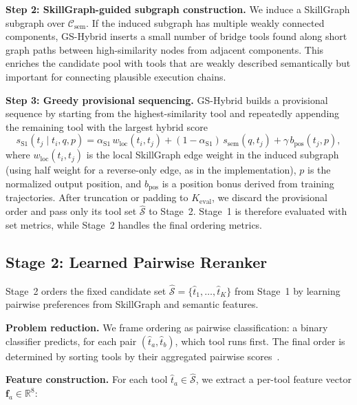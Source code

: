 \documentclass[lettersize,journal]{IEEEtran}
\begin{document}
\textbf{Step 2: SkillGraph-guided subgraph construction.}
We induce a SkillGraph subgraph over $\mathcal{C}_{\text{sem}}$.
If the induced subgraph has multiple weakly connected components, GS-Hybrid inserts a small number of bridge tools found along short graph paths between high-similarity nodes from adjacent components.
This enriches the candidate pool with tools that are weakly described semantically but important for connecting plausible execution chains.

\textbf{Step 3: Greedy provisional sequencing.}
GS-Hybrid builds a provisional sequence by starting from the highest-similarity tool and repeatedly appending the remaining tool with the largest hybrid score
\begin{equation}
    s_{\text{S1}}(t_j \mid t_i, q, p)
    = \alpha_{\text{S1}} \, w_{\text{loc}}(t_i, t_j)
    + (1 - \alpha_{\text{S1}})\, s_{\text{sem}}(q, t_j)
    + \gamma \, b_{\text{pos}}(t_j, p),
    \label{eq:stage1score}
\end{equation}
where $w_{\text{loc}}(t_i, t_j)$ is the local SkillGraph edge weight in the induced subgraph (using half weight for a reverse-only edge, as in the implementation), $p$ is the normalized output position, and $b_{\text{pos}}$ is a position bonus derived from training trajectories.
After truncation or padding to $K_{\mathrm{eval}}$, we discard the provisional order and pass only its tool set $\hat{\mathcal{S}}$ to Stage~2. Stage~1 is therefore evaluated with set metrics, while Stage~2 handles the final ordering metrics.

\subsection{Stage 2: Learned Pairwise Reranker}
\label{sec:framework-lr}

Stage~2 orders the fixed candidate set $\hat{\mathcal{S}} = \{\hat{t}_1, \ldots, \hat{t}_K\}$ from Stage~1 by learning pairwise preferences from SkillGraph and semantic features.

\textbf{Problem reduction.}
We frame ordering as pairwise classification: a binary classifier predicts, for each pair $(\hat{t}_a, \hat{t}_b)$, which tool runs first.
The final order is determined by sorting tools by their aggregated pairwise scores~\cite{ranknet}.

\textbf{Feature construction.}
For each tool $\hat{t}_a \in \hat{\mathcal{S}}$, we extract a per-tool feature vector $\mathbf{f}_a \in \mathbb{R}^8$:
\end{document}

